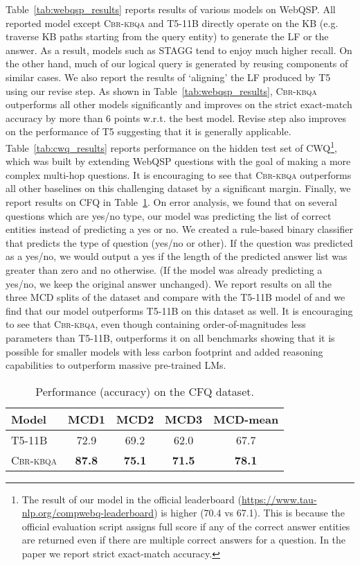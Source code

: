 \documentclass[11pt]{article}
\newcommand{\alg}{\textsc{Cbr-kbqa}\xspace}
\begin{document}
Table~\ref{tab:webqsp_results} reports results of various models on WebQSP. 
All reported model except \alg and T5-11B directly operate on the KB (e.g. traverse KB paths starting from the query entity) to generate the LF or the answer. As a result, models such as STAGG tend to enjoy much higher recall. On the other hand, much of our logical query is generated by reusing components of similar cases. We also report the results of `aligning' the LF produced by T5 using our revise step.  As shown in Table~\ref{tab:webqsp_results}, \alg outperforms all other models significantly and improves on the strict exact-match accuracy by more than 6 points w.r.t. the best model. Revise step also improves on the performance of T5 suggesting that it is generally applicable. Table~\ref{tab:cwq_results} reports performance on the hidden test set of CWQ\footnote{The result of our model in the official leaderboard (\url{https://www.tau-nlp.org/compwebq-leaderboard}) is higher (70.4 vs 67.1). This is because the official evaluation script assigns full score if any of the correct answer entities are returned even if there are multiple correct answers for a question. In the paper we report strict exact-match accuracy.}, which was built by extending WebQSP questions with the goal of making a more complex multi-hop questions. It is encouraging to see that \alg outperforms all other baselines on this challenging dataset by a significant margin. Finally, we report results on CFQ in Table~\ref{tab:my_label}. On error analysis, we found that on several questions which are yes/no type, our model was predicting the list of correct entities instead of predicting a yes or no. We created a rule-based binary classifier that predicts the type of question (yes/no or other). If the question was predicted as a yes/no, we would output a yes if the length of the predicted answer list was greater than zero and no otherwise. (If the model was already predicting a yes/no, we keep the original answer unchanged). We report results on all the three MCD splits of the dataset and compare with the T5-11B model of \citet{furrer2020compositional} and we find that our model outperforms T5-11B on this dataset as well. It is encouraging to see that \alg, even though containing order-of-magnitudes less parameters than T5-11B, outperforms it on all benchmarks showing that it is possible for smaller models with less carbon footprint and added reasoning capabilities to outperform massive pre-trained LMs.



\begin{table}[t]
    \centering
    \small
    \begin{tabular}{@{}l c c c c@{}}
    \toprule
        Model  & MCD1 & MCD2 & MCD3 & MCD-mean\\\midrule
         T5-11B & 72.9 & 69.2 & 62.0 & 67.7\\
         \alg & \textbf{87.8} & \textbf{75.1} & \textbf{71.5} & \textbf{78.1}\\
\bottomrule
    \end{tabular}
    \caption{Performance (accuracy) on the CFQ dataset.}
    \label{tab:my_label}
    \vspace{-5mm}
\end{table}
\end{document}
